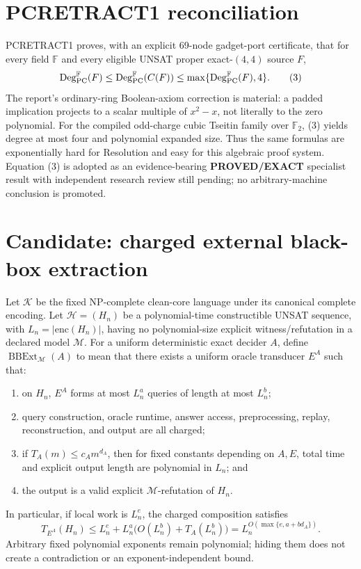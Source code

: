 \documentclass[11pt]{article}
\newcommand{\EXACT}{\textbf{PROVED/EXACT}}
\begin{document}
\section{PCRETRACT1 reconciliation}
PCRETRACT1 proves, with an explicit 69-node gadget-port certificate, that for
every field $\mathbb F$ and every eligible UNSAT proper exact-$(4,4)$ source
$F$,
\[
 \operatorname{Deg}_{\rm PC}^{\mathbb F}(F)
 \le \operatorname{Deg}_{\rm PC}^{\mathbb F}(C(F))
 \le \max\{\operatorname{Deg}_{\rm PC}^{\mathbb F}(F),4\}. \tag{3}
\]
The report's ordinary-ring Boolean-axiom correction is material: a padded
implication projects to a scalar multiple of $x^2-x$, not literally to the
zero polynomial.  For the compiled odd-charge cubic Tseitin family over
$\mathbb F_2$, (3) yields degree at most four and polynomial expanded size.
Thus the same formulas are exponentially hard for Resolution and easy for
this algebraic proof system.  Equation (3) is adopted as an evidence-bearing
\EXACT{} specialist result with independent research review still pending;
no arbitrary-machine conclusion is promoted.

\section{Candidate: charged external black-box extraction}
Let $\mathcal K$ be the fixed NP-complete clean-core language under its
canonical complete encoding.  Let $\mathcal H=(H_n)$ be a polynomial-time
constructible UNSAT sequence, with $L_n=|\mathrm{enc}(H_n)|$, having no
polynomial-size explicit witness/refutation in a declared model $\mathcal M$.
For a uniform deterministic exact decider $A$, define
$\operatorname{BBExt}_{\mathcal M}(A)$ to mean that there exists a uniform
oracle transducer $E^A$ such that:
\begin{enumerate}
\item on $H_n$, $E^A$ forms at most $L_n^a$ queries of length at most $L_n^b$;
\item query construction, oracle runtime, answer access, preprocessing,
replay, reconstruction, and output are all charged;
\item if $T_A(m)\le c_A m^{d_A}$, then for fixed constants depending on
$A,E$, total time and explicit output length are polynomial in $L_n$; and
\item the output is a valid explicit $\mathcal M$-refutation of $H_n$.
\end{enumerate}
In particular, if local work is $L_n^e$, the charged composition satisfies
\[
 T_{E^A}(H_n)
 \le L_n^e+L_n^a\bigl(O(L_n^b)+T_A(L_n^b)\bigr)
 =L_n^{O(\max\{e,a+bd_A\})}.                              \tag{4}
\]
Arbitrary fixed polynomial exponents remain polynomial; hiding them does not
create a contradiction or an exponent-independent bound.
\end{document}
